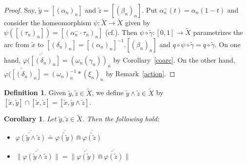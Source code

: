 \documentclass{amsart}
\newtheorem{corollary}[theorem]{Corollary}
\theoremstyle{definition}
\newtheorem{definition}[theorem]{Definition}
\theoremstyle{remark}
\numberwithin{equation}{section}
\begin{document}
\begin{proof} Say, $\tilde{y}=[(\alpha_n)_n]$ and $\tilde{z}=[(\beta_n)_n]$. Put $\alpha^-_n(t)=\alpha_n(1-t)$ and
consider the homeomorphism $\psi:\tilde{X}\rightarrow \tilde{X}$ given by $\psi([(\tau_n)_n])=[(\alpha^-_n\cdot \tau_n)_n]$ (cf.\@ \cite[Lemma~2.6]{FZ2}). Then $\psi\circ \tilde{\gamma}:[0,1]\rightarrow \tilde{X}$  parametrizes the  arc from $\tilde{x}$ to $[(\delta_n)_n]=[(\alpha_n)_n]^{-1}.[(\beta_n)_n]$  and $q\circ\psi\circ \tilde{\gamma}=q\circ \tilde{\gamma}$. On one hand, $\overline{\overleftarrow{\varphi([(\delta_n)_n]}}=(\omega_n(\gamma_n))_n$ by Corollary~\ref{coarc}. On the other hand, $\overleftarrow{\varphi([(\delta_n)_n]}=(\omega_n)_n^{-1}\ast (\xi_n)_n$ by Remark~\ref{action}.
\end{proof}

\begin{definition}
 Given $\tilde{y},\tilde{z}\in\tilde{X}$, we define $\tilde{y}\wedge \tilde{z}\in\tilde{X}$ by $[\tilde{x},\tilde{y}]\cap[\tilde{x},\tilde{z}]=[\tilde{x},\tilde{y}\wedge\tilde{z}]$.
\end{definition}

\begin{corollary}\label{meet} Let $\tilde{y},\tilde{z}\in \tilde{X}$. Then the following hold: \vspace{5pt} \begin{itemize}
\item[(a)] $\overline{\overleftarrow{\varphi(\tilde{y}\wedge\tilde{z})}}\doteq\overline{\overleftarrow{\varphi(\tilde{y})}}\Cap  \overline{\overleftarrow{\varphi(\tilde{z})}}$\vspace{10pt}
    \item[(b)] $\|\overline{\overleftarrow{\varphi(\tilde{y}\wedge\tilde{z})}}\|=\|\overline{\overleftarrow{\varphi(\tilde{y})}}\Cap \overline{\overleftarrow{\varphi(\tilde{z})}}\|$
        \end{itemize}
\end{corollary}
\end{document}
